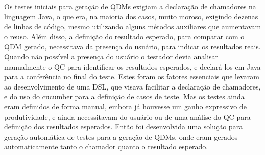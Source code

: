 Os testes iniciais para geração de QDMs exigiam a declaração de chamadores na linguagem Java, o que era, na maioria dos casos, muito moroso, exigindo dezenas de linhas de código, mesmo utilizando alguns métodos auxiliares que aumentavam o reuso. Além disso, a definição do resultado esperado, para comparar com o QDM gerado, necessitava da presença do usuário, para indicar os resultados reais. Quando não possível a presença do usuário o testador devia analisar manualmente o QC para identificar os resultados esperados, e declará-los em Java para a conferência no final do teste. Estes foram os fatores essenciais que levaram ao desenvolvimento de uma DSL, que visava facilitar a declaração de chamadores, e do uso do cucumber para a definição de casos de teste. Mas os testes ainda eram definidos de forma manual, embora já houvesse um ganho expressivo de produtividade, e ainda necessitavam do usuário ou de uma análise do QC para definição dos resultados esperados. Então foi desenvolvida uma solução para geração automática de testes para a geração de QDMs, onde eram gerados automaticamente tanto o chamador quanto o resultado esperado.


